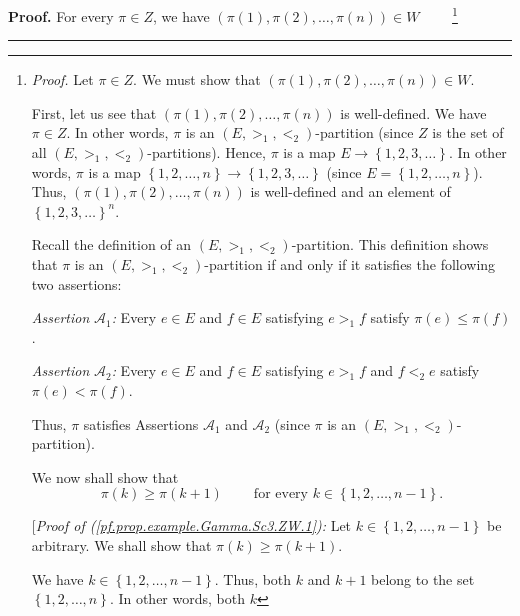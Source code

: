 \documentclass[numbers=enddot,12pt,final,onecolumn,notitlepage,abstracton]{scrartcl}
\theoremstyle{definition}
\newenvironment{proof}[1][Proof]{\noindent\textbf{#1.} }{\ \rule{0.5em}{0.5em}}
\newenvironment{verlong}{}{}
\begin{document}
\begin{verlong}
\begin{footnotesize}
\begin{proof}
For every $\pi\in Z$, we have $\left(  \pi\left(  1\right)  ,\pi\left(
2\right)  ,\ldots,\pi\left(  n\right)  \right)  \in W$%
\ \ \ \ \footnote{\textit{Proof.} Let $\pi\in Z$. We must show that $\left(
\pi\left(  1\right)  ,\pi\left(  2\right)  ,\ldots,\pi\left(  n\right)
\right)  \in W$.
\par
First, let us see that $\left(  \pi\left(  1\right)  ,\pi\left(  2\right)
,\ldots,\pi\left(  n\right)  \right)  $ is well-defined. We have $\pi\in Z$.
In other words, $\pi$ is an $\left(  E,>_{1},<_{2}\right)  $-partition (since
$Z$ is the set of all $\left(  E,>_{1},<_{2}\right)  $-partitions). Hence,
$\pi$ is a map $E\rightarrow\left\{  1,2,3,\ldots\right\}  $. In other words,
$\pi$ is a map $\left\{  1,2,\ldots,n\right\}  \rightarrow\left\{
1,2,3,\ldots\right\}  $ (since $E=\left\{  1,2,\ldots,n\right\}  $). Thus,
$\left(  \pi\left(  1\right)  ,\pi\left(  2\right)  ,\ldots,\pi\left(
n\right)  \right)  $ is well-defined and an element of $\left\{
1,2,3,\ldots\right\}  ^{n}$.
\par
Recall the definition of an $\left(  E,>_{1},<_{2}\right)  $-partition. This
definition shows that $\pi$ is an $\left(  E,>_{1},<_{2}\right)  $-partition
if and only if it satisfies the following two assertions:
\par
\textit{Assertion }$\mathcal{A}_{1}$\textit{:} Every $e\in E$ and $f\in E$
satisfying $e>_{1}f$ satisfy $\pi\left(  e\right)  \leq\pi\left(  f\right)  $.
\par
\textit{Assertion }$\mathcal{A}_{2}$\textit{:} Every $e\in E$ and $f\in E$
satisfying $e>_{1}f$ and $f<_{2}e$ satisfy $\pi\left(  e\right)  <\pi\left(
f\right)  $.
\par
Thus, $\pi$ satisfies Assertions $\mathcal{A}_{1}$ and $\mathcal{A}_{2}$
(since $\pi$ is an $\left(  E,>_{1},<_{2}\right)  $-partition).
\par
We now shall show that
\begin{equation}
\pi\left(  k\right)  \geq\pi\left(  k+1\right)  \ \ \ \ \ \ \ \ \ \ \text{for
every }k\in\left\{  1,2,\ldots,n-1\right\}
.\label{pf.prop.example.Gamma.Sc3.ZW.1}%
\end{equation}
\par
[\textit{Proof of (\ref{pf.prop.example.Gamma.Sc3.ZW.1}):} Let $k\in\left\{
1,2,\ldots,n-1\right\}  $ be arbitrary. We shall show that $\pi\left(
k\right)  \geq\pi\left(  k+1\right)  $.
\par
We have $k\in\left\{  1,2,\ldots,n-1\right\}  $. Thus, both $k$ and $k+1$
belong to the set $\left\{  1,2,\ldots,n\right\}  $. In other words, both $k$
}
\end{proof}
\end{footnotesize}
\end{verlong}
\end{document}
